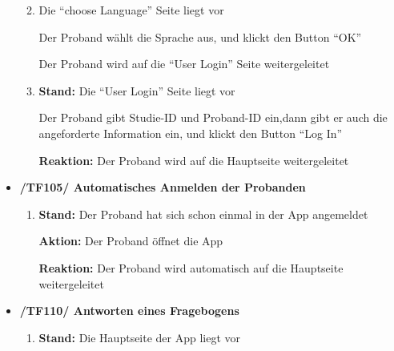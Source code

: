 \documentclass[a4paper]{scrreprt}
\begin{document}
\begin{itemize}
\begin{enumerate}
                        \par \textbf{{\color{blue}{Reaktion: }}} {\color{blue}{Die App wechselt auf die ``choose Language'' Seite}}
                        \item \par \textbf{{\color{blue}{Stand: }}}{\color{blue} Die ``choose Language'' Seite liegt vor}
                        \par \textbf{{\color{blue}{Aktion: }}}{\color{blue}Der Proband wählt die Sprache aus, und klickt den Button ``OK''}
                        \par \textbf{{\color{blue}{Reaktion: }}}{\color{blue}Der Proband wird auf die ``User Login'' Seite weitergeleitet}
                        \item \par \textbf{Stand: }Die ``User Login'' Seite liegt vor
                        \par {}
                        \par \textbf{{\color{blue}{Aktion: }}}{\color{blue}Der Proband gibt Studie-ID und Proband-ID ein,dann gibt er auch die angeforderte Information ein, und klickt den Button ``Log In''}
                        \par \textbf{Reaktion: }Der Proband wird auf die Hauptseite weitergeleitet
                  \end{enumerate}
                  \item \textbf{/TF105/ Automatisches Anmelden der Probanden}
	              \begin{enumerate}
	        	        \item \par \textbf{Stand: }Der Proband hat sich schon einmal in der App angemeldet
	        	        \par \textbf{Aktion: }Der Proband öffnet die App
	        	        \par \textbf{Reaktion: }Der Proband wird automatisch auf die Hauptseite weitergeleitet
	              \end{enumerate}
                  \item \textbf{/TF110/ Antworten eines Fragebogens}
	              \begin{enumerate}
                        \item \par \textbf{Stand: }Die Hauptseite der App liegt vor

\end{enumerate}
\end{itemize}
\end{document}
